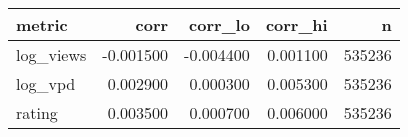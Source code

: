 \begin{tabular}{lrrrr}
\toprule
metric & corr & corr_lo & corr_hi & n \\
\midrule
log_views & -0.001500 & -0.004400 & 0.001100 & 535236 \\
log_vpd & 0.002900 & 0.000300 & 0.005300 & 535236 \\
rating & 0.003500 & 0.000700 & 0.006000 & 535236 \\
\bottomrule
\end{tabular}
